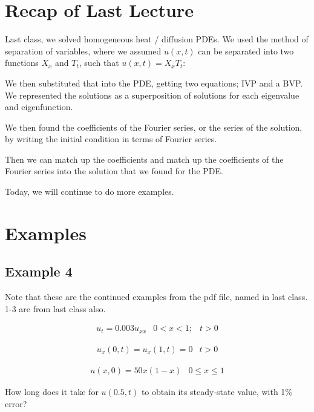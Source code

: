 \graphicspath{{./Lecture10/}}

\section{Recap of Last Lecture}

Last class, we solved homogeneous heat / diffusion PDEs. We used the method of separation of variables, where we assumed $u(x,t)$ can be separated into two functions $X_x$ and $T_t$, such that $u(x,t) = X_x T_t$:

We then substituted that into the PDE, getting two equations; IVP and a BVP. We represented the solutions as a superposition of solutions for each eigenvalue and eigenfunction. 

We then found the coefficients of the Fourier series, or the series of the solution, by writing the initial condition in terms of Fourier series. 

Then we can match up the coefficients and match up the coefficients of the Fourier series into the solution that we found for the PDE. 

Today, we will continue to do more examples. 

\section{Examples}

\subsection{Example 4}

Note that these are the continued examples from the pdf file, named in last class. 1-3 are from last class also. 

$$\begin{matrix} u_t = 0.003 u_{xx} & 0 < x < 1; & t > 0 \end{matrix}$$

$$\begin{matrix} u_x (0,t) = u_x (1,t) = 0 & t > 0 \end{matrix} $$

$$\begin{matrix} u(x,0) = 50x (1-x) & 0 \leq x \leq 1 \end{matrix}$$

How long does it take for $u(0.5,t)$ to obtain its steady-state value, with 1\% error?

\hfill

\hline

